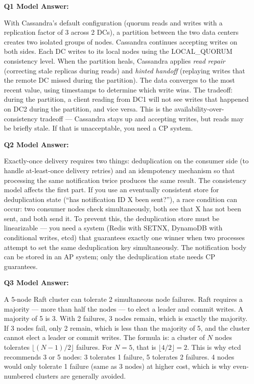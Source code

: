 \documentclass[11pt,a4paper]{article}
\begin{document}
\begin{answerbox}
\textbf{Q1 Model Answer:}

With Cassandra's default configuration (quorum reads and writes with a replication factor of 3 across 2 DCs), a partition between the two data centers creates two isolated groups of nodes. Cassandra continues accepting writes on both sides. Each DC writes to its local nodes using the LOCAL\_QUORUM consistency level. When the partition heals, Cassandra applies \textit{read repair} (correcting stale replicas during reads) and \textit{hinted handoff} (replaying writes that the remote DC missed during the partition). The data converges to the most recent value, using timestamps to determine which write wins. The tradeoff: during the partition, a client reading from DC1 will not see writes that happened on DC2 during the partition, and vice versa. This is the availability-over-consistency tradeoff --- Cassandra stays up and accepting writes, but reads may be briefly stale. If that is unacceptable, you need a CP system.

\vspace{0.6em}

\textbf{Q2 Model Answer:}

Exactly-once delivery requires two things: deduplication on the consumer side (to handle at-least-once delivery retries) and an idempotency mechanism so that processing the same notification twice produces the same result. The consistency model affects the first part. If you use an eventually consistent store for deduplication state (``has notification ID X been sent?''), a race condition can occur: two consumer nodes check simultaneously, both see that X has not been sent, and both send it. To prevent this, the deduplication store must be linearizable --- you need a system (Redis with SETNX, DynamoDB with conditional writes, etcd) that guarantees exactly one winner when two processes attempt to set the same deduplication key simultaneously. The notification body can be stored in an AP system; only the deduplication state needs CP guarantees.

\vspace{0.6em}

\textbf{Q3 Model Answer:}

A 5-node Raft cluster can tolerate 2 simultaneous node failures. Raft requires a majority --- more than half the nodes --- to elect a leader and commit writes. A majority of 5 is 3. With 2 failures, 3 nodes remain, which is exactly the majority. If 3 nodes fail, only 2 remain, which is less than the majority of 5, and the cluster cannot elect a leader or commit writes. The formula is: a cluster of $N$ nodes tolerates $\lfloor (N-1)/2 \rfloor$ failures. For $N=5$, that is $\lfloor 4/2 \rfloor = 2$. This is why etcd recommends 3 or 5 nodes: 3 tolerates 1 failure, 5 tolerates 2 failures. 4 nodes would only tolerate 1 failure (same as 3 nodes) at higher cost, which is why even-numbered clusters are generally avoided.


\end{answerbox}
\end{document}
